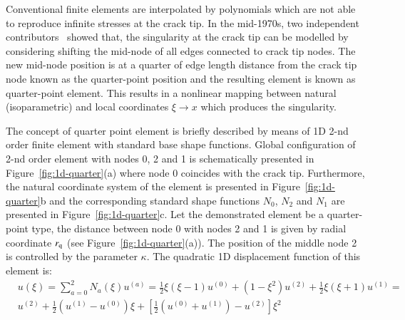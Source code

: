 \documentclass[11pt]{acmeArticle}
\numberwithin{equation}{section}
\begin{document}
Conventional finite elements are interpolated by polynomials which are not able to reproduce infinite stresses at the crack tip. 
In the mid-1970s, two independent contributors~\citep{barsoum1976use,henshell1975crack} showed that, the singularity at the crack tip can be modelled by considering shifting the mid-node of all edges connected to crack tip nodes.
The new mid-node position is at a quarter of edge length distance from the crack tip node known as the quarter-point position and the resulting element is known as quarter-point element. 
This results in a nonlinear mapping between natural (isoparametric) and local coordinates $\xi \rightarrow x$ which produces the singularity. 

The concept of quarter point element is briefly described by means of 1D 2-nd order finite element with standard base shape functions. 
Global configuration of 2-nd order element with nodes 0, 2 and 1 is schematically presented in Figure~\ref{fig:1d-quarter}(a) where node 0 coincides with the crack tip.
Furthermore, the natural coordinate system of the element is presented in Figure~\ref{fig:1d-quarter}b and the corresponding standard shape functions $N_0$, $N_2$ and $N_1$ are presented in Figure~\ref{fig:1d-quarter}c.  
Let the demonstrated element be a quarter-point type, the distance between node 0 with nodes 2 and 1 is given by radial coordinate $r_{\rm q}$ (see Figure~\ref{fig:1d-quarter}(a)). 
The position of the middle node 2 is controlled by the parameter $\kappa$. 
The quadratic 1D displacement function of this element is: 
\begin{equation}\label{eq:crack_disp_func}
\begin{aligned}
&u(\xi) = \sum_{a=0}^2 N_a (\xi) u^{(a)} = \frac{1}{2} \xi (\xi - 1)u^{(0)} + (1 - \xi^2)u^{(2)} + \frac{1}{2} \xi (\xi + 1)u^{(1)} =\\
& u^{(2)} + \frac{1}{2}(u^{(1)} - u^{(0)})\xi + \left[ \frac{1}{2} (u^{(0)} + u^{(1)}) - u^{(2)} \right] \xi^2 
\end{aligned}
\end{equation}
\end{document}
